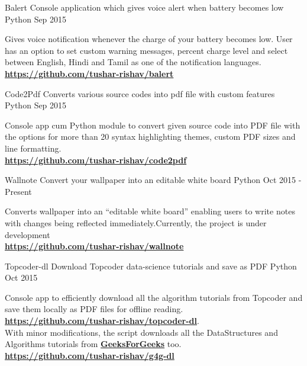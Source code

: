 \begin{cventries}
  \cventry
    {Balert}
    {Console application which gives voice alert when battery becomes low}
    {Python}
    {Sep 2015}
    {
      \begin{cvitems}
        \item {Gives voice notification whenever the charge of your battery becomes low. User has an option to set custom warning messages, percent charge level and select between English, Hindi and Tamil as one of the notification languages.\\ \textbf{\href{https://github.com/tushar-rishav/balert}{https://github.com/tushar-rishav/balert}}
        }
      \end{cvitems}
    }
  \cventry
    {Code2Pdf}
    {Converts various source codes into pdf file with custom features}
    {Python}
    {Sep 2015}
    {
      \begin{cvitems}
        \item {Console app cum Python module to convert given source code into PDF file with the options for more than 20 syntax highlighting themes, custom PDF sizes and line formatting.\\ \textbf{\href{https://github.com/tushar-rishav/code2pdf}{https://github.com/tushar-rishav/code2pdf}}
        }
      \end{cvitems}
    }
  \cventry
    {Wallnote}
    {Convert your wallpaper into an editable white board}
    {Python}
    {Oct 2015 - Present}
    {
      \begin{cvitems}
        \item {Converts wallpaper into an “editable white board” enabling users to write notes with changes being reflected immediately.Currently, the project is
under development\\ \textbf{\href{https://github.com/tushar-rishav/wallnote}{https://github.com/tushar-rishav/wallnote}}
        }
      \end{cvitems}
    }
  \cventry
    {Topcoder-dl}
    {Download Topcoder data-science tutorials and save as PDF}
    {Python}
    {Oct 2015}
    {
      \begin{cvitems}
        \item {Console app to efficiently download all the algorithm tutorials from Topcoder and save them locally as PDF files for offline reading.\\ \textbf{\href{https://github.com/tushar-rishav/topcoder-dl}{https://github.com/tushar-rishav/topcoder-dl}}.\\ With minor modifications, the script downloads all the DataStructures and Algorithms tutorials from \textbf{\href{http://www.geeksforgeeks.org/}{GeeksForGeeks}} too. \\ \textbf{\href{https://github.com/tushar-rishav/g4g-dl}{https://github.com/tushar-rishav/g4g-dl}}
}
\end{cvitems}}
\end{cventries}
